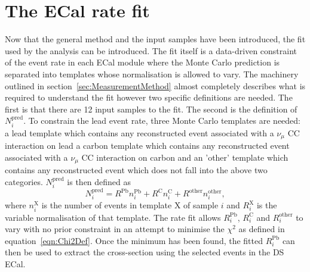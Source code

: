 \section{The ECal rate fit}
\label{sec:ECalRateFit}
Now that the general method and the input samples have been introduced, the fit used by the analysis can be introduced.  The fit itself is a data-driven constraint of the event rate in each ECal module where the Monte Carlo prediction is separated into templates whose normalisation is allowed to vary.  The machinery outlined in section~\ref{sec:MeasurementMethod} almost completely describes what is required to understand the fit however two specific definitions are needed.  The first is that there are 12 input samples to the fit.  The second is the definition of $N^{\textrm{pred}}_i$.  To constrain the lead event rate, three Monte Carlo templates are needed: a lead template which contains any reconstructed event associated with a $\nu_\mu$ CC interaction on lead a carbon template which contains any reconstructed event associated with a $\nu_\mu$ CC interaction on carbon and an 'other' template which contains any reconstructed event which does not fall into the above two categories.  $N^{\textrm{pred}}_i$ is then defined as 
\begin{equation}
  N^{\textrm{pred}}_i = R^{\textrm{Pb}}n^{\textrm{Pb}}_i + R^{\textrm{C}}n^{\textrm{C}}_i + R^{\textrm{other}}n^{\textrm{other}}_i,
  \label{eqn:ECalFitPredDef}
\end{equation}
where $n^{\textrm{X}}_i$ is the number of events in template X of sample $i$ and $R^{\textrm{X}}_i$ is the variable normalisation of that template.
\newline
\newline
The rate fit allows $R^{\textrm{Pb}}_i$, $R^{\textrm{C}}_i$ and $R^{\textrm{other}}_i$ to vary with no prior constraint in an attempt to minimise the $\chi^{2}$ as defined in equation~\ref{eqn:Chi2Def}.  Once the minimum has been found, the fitted $R^{\textrm{Pb}}_i$ can then be used to extract the cross-section using the selected events in the DS ECal.  
\newline
\newline

